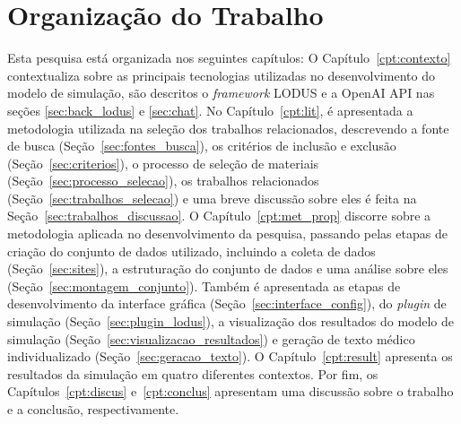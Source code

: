 \section{Organização do Trabalho}
Esta pesquisa está organizada nos seguintes capítulos: O Capítulo~\ref{cpt:contexto} contextualiza sobre as principais tecnologias utilizadas no desenvolvimento do modelo de simulação, são descritos o \textit{framework} LODUS e a OpenAI API nas seções \ref{sec:back_lodus} e \ref{sec:chat}. No Capítulo~\ref{cpt:lit}, é apresentada a metodologia utilizada na seleção dos trabalhos relacionados, descrevendo a fonte de busca (Seção~\ref{sec:fontes_busca}), os critérios de inclusão e exclusão (Seção~\ref{sec:criterios}), o processo de seleção de materiais (Seção~\ref{sec:processo_selecao}), os trabalhos relacionados (Seção~\ref{sec:trabalhos_selecao}) e uma breve discussão sobre eles é feita na Seção~\ref{sec:trabalhos_discussao}. O Capítulo~\ref{cpt:met_prop} discorre sobre a metodologia aplicada no desenvolvimento da pesquisa, passando pelas etapas de criação do conjunto de dados utilizado, incluindo a coleta de dados (Seção~\ref{sec:sites}), a estruturação do conjunto de dados e uma análise sobre eles (Seção~\ref{sec:montagem_conjunto}). Também é apresentada as etapas de desenvolvimento da interface gráfica (Seção~\ref{sec:interface_config}), do \textit{plugin} de simulação (Seção~\ref{sec:plugin_lodus}), a visualização dos resultados do modelo de simulação (Seção~\ref{sec:visualizacao_resultados}) e geração de texto médico individualizado (Seção~\ref{sec:geracao_texto}). O Capítulo~\ref{cpt:result} apresenta os resultados da simulação em quatro diferentes contextos. Por fim, os Capítulos~\ref{cpt:discus} e~\ref{cpt:conclus} apresentam uma discussão sobre o trabalho e a conclusão, respectivamente.

